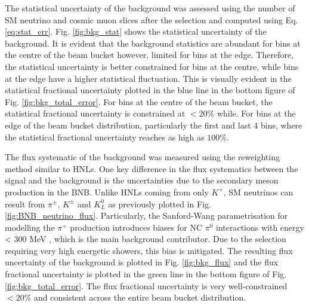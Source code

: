 The statistical uncertainty of the background was assessed using the number of SM neutrino and cosmic muon slices after the selection and computed using Eq. \ref{eq:stat_err}.
Fig. \ref{fig:bkg_stat} shows the statistical uncertainty of the background.
It is evident that the background statistics are abundant for bins at the centre of the beam bucket however, limited for bins at the edge.
Therefore, the statistical uncertainty is better constrained for bins at the centre, while bins at the edge have 
a higher statistical fluctuation.
This is visually evident in the statistical fractional uncertainty plotted in the blue line in the bottom figure of Fig. \ref{fig:bkg_total_error}.                                                                               
For bins at the centre of the beam bucket, the statistical fractional uncertainty is constrained at $< 20\%$ while.
For bins at the edge of the beam bucket distribution, particularly the first and last 4 bins, where the statistical fractional uncertainty reaches as high as $100\%$.

The flux systematic of the background was measured using the reweighting method similar to HNLs.              
One key difference in the flux systematics between the signal and the background is the uncertainties due to the secondary meson production in the BNB.                                                                           
Unlike HNLs coming from only $K^+$, SM neutrinos can result from $\pi^\pm$, $K^\pm$ and $K^0_L$ as previously plotted in Fig. \ref{fig:BNB_neutrino_flux}.
Particularly, the Sanford-Wang parametrisation for modelling the $\pi^+$ production introduces biases for NC $\pi^0$ interactions with energy < 300 MeV \cite{EdPhD}, which is the main background contributor.
Due to the selection requiring very high energetic showers, this bias is mitigated.
The resulting flux uncertainty of the background is plotted in Fig. \ref{fig:bkg_flux} and the flux fractional uncertainty is plotted in the green line in the bottom figure of Fig. \ref{fig:bkg_total_error}.
The flux fractional uncertainty is very well-constrained $<20 \%$ and consistent across the entire beam bucket distribution.

